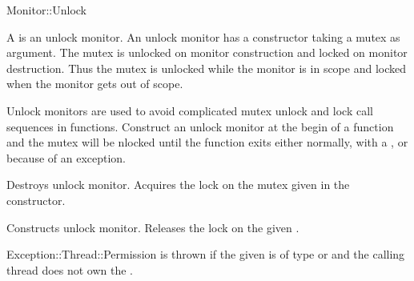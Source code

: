 \begin{classpage}{Monitor::Unlock}

A  is an unlock monitor. An unlock monitor has
a constructor taking a mutex as argument. The mutex is unlocked on
monitor construction and locked on monitor destruction. Thus the mutex
is unlocked while the monitor is in scope and locked when the monitor
gets out of scope.

Unlock monitors are used to avoid complicated mutex unlock and lock
call sequences in functions. Construct an unlock monitor at the begin
of a function and the mutex will be nlocked until the function exits
either normally, with a , or because of an exception.


\begin{mandescription}
  \destructor
  Destroys  unlock monitor. Acquires the lock on the mutex
  given in the constructor.

  Constructs  unlock monitor. Releases the lock on the given
  .
  \begin{exception}
    \item[Exception::Thread::Permission] is thrown if the given
       is of type  or
       and the calling thread does not own
      the .
  \end{exception}
\end{mandescription}

\end{classpage}

